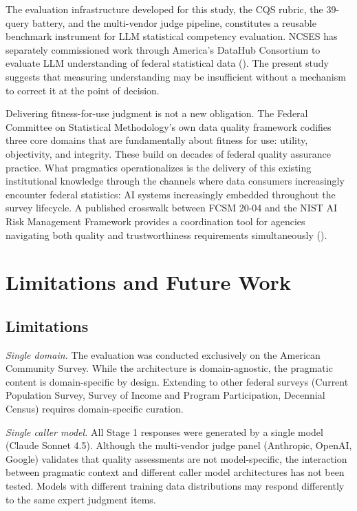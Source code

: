 \documentclass[
  11pt,
  letterpaper,
]{article}
\begin{document}
The evaluation infrastructure developed for this study, the CQS rubric,
the 39-query battery, and the multi-vendor judge pipeline, constitutes a
reusable benchmark instrument for LLM statistical competency evaluation.
NCSES has separately commissioned work through America's DataHub
Consortium to evaluate LLM understanding of federal statistical data
(). The present study suggests that measuring
understanding may be insufficient without a mechanism to correct it at
the point of decision.

Delivering fitness-for-use judgment is not a new obligation. The Federal
Committee on Statistical Methodology's own data quality framework
codifies three core domains that are fundamentally about fitness for
use: utility, objectivity, and integrity. These build on decades of
federal quality assurance practice. What pragmatics operationalizes is
the delivery of this existing institutional knowledge through the
channels where data consumers increasingly encounter federal statistics:
AI systems increasingly embedded throughout the survey lifecycle. A
published crosswalk between FCSM 20-04 and the NIST AI Risk Management
Framework provides a coordination tool for agencies navigating both
quality and trustworthiness requirements simultaneously
().

\section{Limitations and Future Work}\label{limitations-and-future-work}

\subsection{Limitations}\label{limitations}

\emph{Single domain.} The evaluation was conducted exclusively on the
American Community Survey. While the architecture is domain-agnostic,
the pragmatic content is domain-specific by design. Extending to other
federal surveys (Current Population Survey, Survey of Income and Program
Participation, Decennial Census) requires domain-specific curation.

\emph{Single caller model.} All Stage 1 responses were generated by a
single model (Claude Sonnet 4.5). Although the multi-vendor judge panel
(Anthropic, OpenAI, Google) validates that quality assessments are not
model-specific, the interaction between pragmatic context and different
caller model architectures has not been tested. Models with different
training data distributions may respond differently to the same expert
judgment items.
\end{document}
